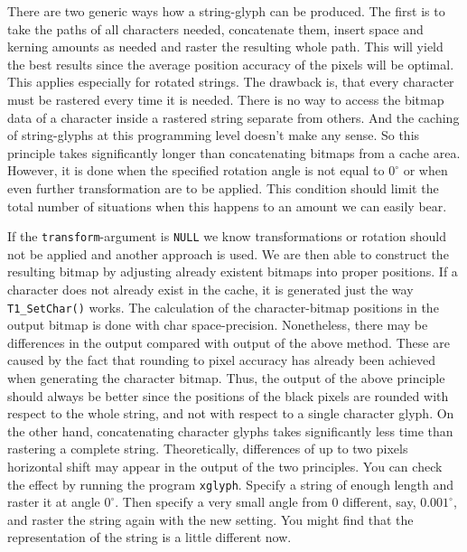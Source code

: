 There are two generic ways how a string-glyph can be produced. The first is to
take the paths of all characters needed, concatenate them, insert space and
kerning amounts as needed and raster the resulting whole path. This will yield
the best results since the average position accuracy of the pixels will be
optimal. This applies especially for rotated strings. The drawback is, that
every character must be rastered every time it is needed. There is no way to
access the bitmap data of a character inside a rastered string separate from
others. And the caching of string-glyphs at this programming level doesn't
make any sense. So this principle takes significantly longer than
concatenating bitmaps from a cache area. However, it is done when the
specified rotation angle is not equal to $0^\circ$ or when even further
transformation are to be applied.  This condition should limit the total
number of situations when this happens to an amount we can easily bear.

If the \verb+transform+-argument is \verb+NULL+ we know transformations or
rotation should not be applied and another approach is used. We are then able
to construct the resulting bitmap by adjusting already existent bitmaps into
proper positions.  If a character does not already exist in the cache, it is
generated just the way \verb+T1_SetChar()+ works. The calculation of the
character-bitmap positions in the output bitmap is done with
char space-precision.  Nonetheless, there may be differences in the output
compared with output of the above method. These are caused by the fact that
rounding to pixel accuracy has already been achieved when generating the
character bitmap. Thus, the output of the above principle should always be
better since the positions of the black pixels are rounded with respect to the
whole string, and not with respect to a single character glyph. On the other
hand, concatenating character glyphs takes significantly less time than
rastering a complete string.  Theoretically, differences of up to two pixels
horizontal shift may appear in the output of the two principles. You can
check the effect by running the program \verb+xglyph+. Specify a string of
enough length and raster it at angle $0^\circ$. Then specify a very small
angle from 0 different, say, $0.001^\circ$, and raster the string again with
the new setting. You might find that the representation of the string is a
little different now.

